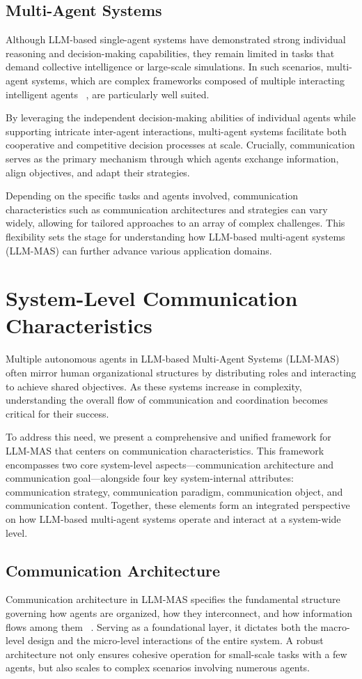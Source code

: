 \subsection{Multi-Agent Systems}
Although LLM-based single-agent systems have demonstrated strong individual reasoning and decision-making capabilities, they remain limited in tasks that demand collective intelligence or large-scale simulations. In such scenarios, multi-agent systems, which are complex frameworks composed of multiple interacting intelligent agents ~\cite{mas_define}, are particularly well suited.

By leveraging the independent decision-making abilities of individual agents while supporting intricate inter-agent interactions, multi-agent systems facilitate both cooperative and competitive decision processes at scale. Crucially, communication serves as the primary mechanism through which agents exchange information, align objectives, and adapt their strategies.

Depending on the specific tasks and agents involved, communication characteristics such as communication architectures and strategies can vary widely, allowing for tailored approaches to an array of complex challenges. This flexibility sets the stage for understanding how LLM-based multi-agent systems (LLM-MAS) can further advance various application domains.

\section{System-Level Communication Characteristics}
Multiple autonomous agents in LLM-based Multi-Agent Systems (LLM-MAS) often mirror human organizational structures by distributing roles and interacting to achieve shared objectives. As these systems increase in complexity, understanding the overall flow of communication and coordination becomes critical for their success.

To address this need, we present a comprehensive and unified framework for LLM-MAS that centers on communication characteristics. This framework encompasses two core system-level aspects—communication architecture and communication goal—alongside four key system-internal attributes: communication strategy, communication paradigm, communication object, and communication content. Together, these elements form an integrated perspective on how LLM-based multi-agent systems operate and interact at a system-wide level.

\subsection{Communication Architecture}
Communication architecture in LLM-MAS specifies the fundamental structure governing how agents are organized, how they interconnect, and how information flows among them ~\cite{mas_a_survey}. Serving as a foundational layer, it dictates both the macro-level design and the micro-level interactions of the entire system. A robust architecture not only ensures cohesive operation for small-scale tasks with a few agents, but also scales to complex scenarios involving numerous agents.

